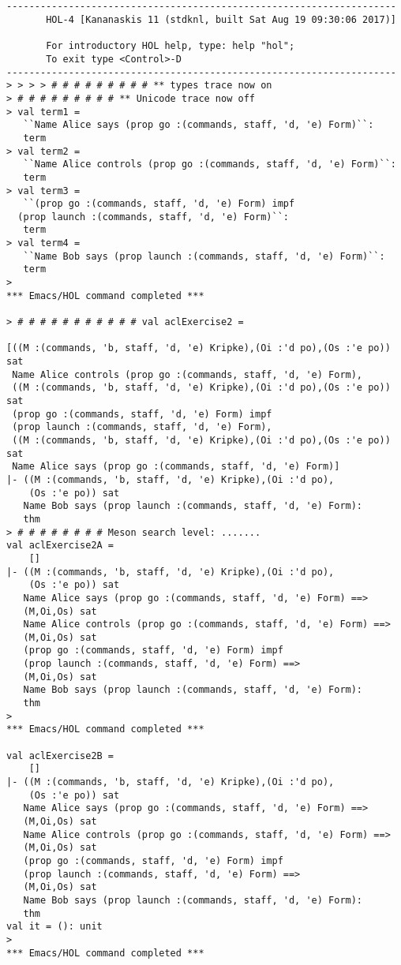 \documentclass{report}
\begin{document}
\setcounter{sessioncount}{0}
\begin{session}
  \begin{scriptsize}
\begin{verbatim}


---------------------------------------------------------------------
       HOL-4 [Kananaskis 11 (stdknl, built Sat Aug 19 09:30:06 2017)]

       For introductory HOL help, type: help "hol";
       To exit type <Control>-D
---------------------------------------------------------------------
> > > > # # # # # # # # # ** types trace now on
> # # # # # # # # # ** Unicode trace now off
> val term1 =
   ``Name Alice says (prop go :(commands, staff, 'd, 'e) Form)``:
   term
> val term2 =
   ``Name Alice controls (prop go :(commands, staff, 'd, 'e) Form)``:
   term
> val term3 =
   ``(prop go :(commands, staff, 'd, 'e) Form) impf
  (prop launch :(commands, staff, 'd, 'e) Form)``:
   term
> val term4 =
   ``Name Bob says (prop launch :(commands, staff, 'd, 'e) Form)``:
   term
> 
*** Emacs/HOL command completed ***

> # # # # # # # # # # # val aclExercise2 =
   
[((M :(commands, 'b, staff, 'd, 'e) Kripke),(Oi :'d po),(Os :'e po)) sat
 Name Alice controls (prop go :(commands, staff, 'd, 'e) Form),
 ((M :(commands, 'b, staff, 'd, 'e) Kripke),(Oi :'d po),(Os :'e po)) sat
 (prop go :(commands, staff, 'd, 'e) Form) impf
 (prop launch :(commands, staff, 'd, 'e) Form),
 ((M :(commands, 'b, staff, 'd, 'e) Kripke),(Oi :'d po),(Os :'e po)) sat
 Name Alice says (prop go :(commands, staff, 'd, 'e) Form)]
|- ((M :(commands, 'b, staff, 'd, 'e) Kripke),(Oi :'d po),
    (Os :'e po)) sat
   Name Bob says (prop launch :(commands, staff, 'd, 'e) Form):
   thm
> # # # # # # # # Meson search level: .......
val aclExercise2A =
    []
|- ((M :(commands, 'b, staff, 'd, 'e) Kripke),(Oi :'d po),
    (Os :'e po)) sat
   Name Alice says (prop go :(commands, staff, 'd, 'e) Form) ==>
   (M,Oi,Os) sat
   Name Alice controls (prop go :(commands, staff, 'd, 'e) Form) ==>
   (M,Oi,Os) sat
   (prop go :(commands, staff, 'd, 'e) Form) impf
   (prop launch :(commands, staff, 'd, 'e) Form) ==>
   (M,Oi,Os) sat
   Name Bob says (prop launch :(commands, staff, 'd, 'e) Form):
   thm
> 
*** Emacs/HOL command completed ***

val aclExercise2B =
    []
|- ((M :(commands, 'b, staff, 'd, 'e) Kripke),(Oi :'d po),
    (Os :'e po)) sat
   Name Alice says (prop go :(commands, staff, 'd, 'e) Form) ==>
   (M,Oi,Os) sat
   Name Alice controls (prop go :(commands, staff, 'd, 'e) Form) ==>
   (M,Oi,Os) sat
   (prop go :(commands, staff, 'd, 'e) Form) impf
   (prop launch :(commands, staff, 'd, 'e) Form) ==>
   (M,Oi,Os) sat
   Name Bob says (prop launch :(commands, staff, 'd, 'e) Form):
   thm
val it = (): unit
> 
*** Emacs/HOL command completed ***
\end{verbatim}
  \end{scriptsize}
\end{session}
\end{document}
